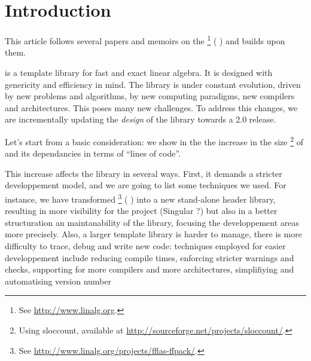 \section{Introduction}
%
This article follows several papers and memoirs on the \linbox%
%
\footnote{See \url{http://www.linalg.org}.}
%
(\cf{} \cite{Giorgi:2004:these,Turner:2002:these,Boyer:2012:these,Dumas:2002:icms,Dumas:2010:lbpar})
and builds upon them.

\linbox is a \cpp template library for fast and exact linear algebra. It is designed with genericity
and efficiency in mind.
%
%
The \linbox library is under constant evolution, driven by new problems and
algorithms, by new computing paradigms, new compilers and architectures. This
poses many new challenges. To address this changes, we are incrementally
updating the \emph{design} of the library towards a \textsf{2.0} release.
%
\par
%
Let's start from a basic consideration: we show in the  the
increase in the size%
%
\footnote{Using \textsf{sloccount}, available at
\url{http://sourceforge.net/projects/sloccount/}.}
%
of \linbox and its dependancies in terms of ``lines of code''.
%
%

%
This increase affects the library in several ways.  First, it demands a
stricter developpement model, and we are going to list some techniques we used.
For instance, we have transformed \fflasffpack %
%
\footnote{See \url{http://www.linalg.org/projects/fflas-ffpack/}.}
(\cf{} \cite{Dumas:2008:Flas}) into a new stand-alone header library, resulting
in more visibility for the \fflasffpack project (Singular ?) but also in a better
structuration an maintanability of the library, focusing the developpement
areas more precisely.
%
%
Also, a larger template library is harder to manage, there is more difficulty
to trace, debug and write new code: techniques employed
for easier developpement include reducing
compile times, enforcing stricter warnings and checks, supporting for more
compilers and more architectures, simplifiying and automatising version number
